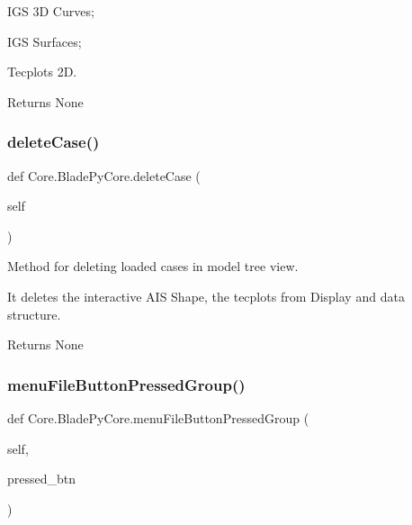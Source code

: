 \begin{DoxyItemize}
\item I\+GS 3D Curves; \item I\+GS Surfaces; \item Tecplots 2D.\end{DoxyItemize}
\begin{DoxyReturn}{Returns}
None 
\end{DoxyReturn}
\hypertarget{class_core_1_1_blade_py_core_a305ea5ff4997029c7a54a4550a23eba8}{}\label{class_core_1_1_blade_py_core_a305ea5ff4997029c7a54a4550a23eba8} 
\subsubsection{\texorpdfstring{delete\+Case()}{deleteCase()}}
{\footnotesize\ttfamily def Core.\+Blade\+Py\+Core.\+delete\+Case (\begin{DoxyParamCaption}\item[{}]{self }\end{DoxyParamCaption})}



Method for deleting loaded cases in model tree view. 

It deletes the interactive A\+IS Shape, the tecplots from Display and data structure.

\begin{DoxyReturn}{Returns}
None 
\end{DoxyReturn}
\hypertarget{class_core_1_1_blade_py_core_aedcbcf23c32b9661d48f28e11c0c7172}{}\label{class_core_1_1_blade_py_core_aedcbcf23c32b9661d48f28e11c0c7172} 
\subsubsection{\texorpdfstring{menu\+File\+Button\+Pressed\+Group()}{menuFileButtonPressedGroup()}}
{\footnotesize\ttfamily def Core.\+Blade\+Py\+Core.\+menu\+File\+Button\+Pressed\+Group (\begin{DoxyParamCaption}\item[{}]{self,  }\item[{}]{pressed\+\_\+btn }\end{DoxyParamCaption})}



